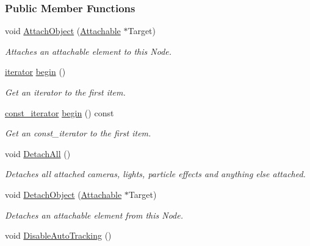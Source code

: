 \subsubsection*{Public Member Functions}
\begin{DoxyCompactItemize}
\item 
void \hyperlink{classMezzanine_1_1WorldNode_a241c57161dea141aa0820e9439517f85}{AttachObject} (\hyperlink{classMezzanine_1_1Attachable}{Attachable} $\ast$Target)
\begin{DoxyCompactList}\small\item\em Attaches an attachable element to this Node. \item\end{DoxyCompactList}\item 
\hyperlink{classMezzanine_1_1WorldNode_a2057d95435b0675936fe71ccb047f261}{iterator} \hyperlink{classMezzanine_1_1WorldNode_a5b32b7d9aa01b687a833578fd2df85d8}{begin} ()
\begin{DoxyCompactList}\small\item\em Get an iterator to the first item. \item\end{DoxyCompactList}\item 
\hyperlink{classMezzanine_1_1WorldNode_aa7097dbbb9b0920f6d9952e3315227fa}{const\_\-iterator} \hyperlink{classMezzanine_1_1WorldNode_af3b785a3ce4d47b449ff561946a814e6}{begin} () const 
\begin{DoxyCompactList}\small\item\em Get an const\_\-iterator to the first item. \item\end{DoxyCompactList}\item 
\hypertarget{classMezzanine_1_1WorldNode_a5143813d93701bd6d3eb0a52149eb23d}{
void \hyperlink{classMezzanine_1_1WorldNode_a5143813d93701bd6d3eb0a52149eb23d}{DetachAll} ()}
\label{classMezzanine_1_1WorldNode_a5143813d93701bd6d3eb0a52149eb23d}

\begin{DoxyCompactList}\small\item\em Detaches all attached cameras, lights, particle effects and anything else attached. \item\end{DoxyCompactList}\item 
void \hyperlink{classMezzanine_1_1WorldNode_ada720c4ee3ab582c307f9490396e6cfd}{DetachObject} (\hyperlink{classMezzanine_1_1Attachable}{Attachable} $\ast$Target)
\begin{DoxyCompactList}\small\item\em Detaches an attachable element from this Node. \item\end{DoxyCompactList}\item 
\hypertarget{classMezzanine_1_1WorldNode_a4166c8c884ac8a05b45ae0b4244f4ee9}{
void \hyperlink{classMezzanine_1_1WorldNode_a4166c8c884ac8a05b45ae0b4244f4ee9}{DisableAutoTracking} ()}
\label{classMezzanine_1_1WorldNode_a4166c8c884ac8a05b45ae0b4244f4ee9}


\end{DoxyCompactItemize}
